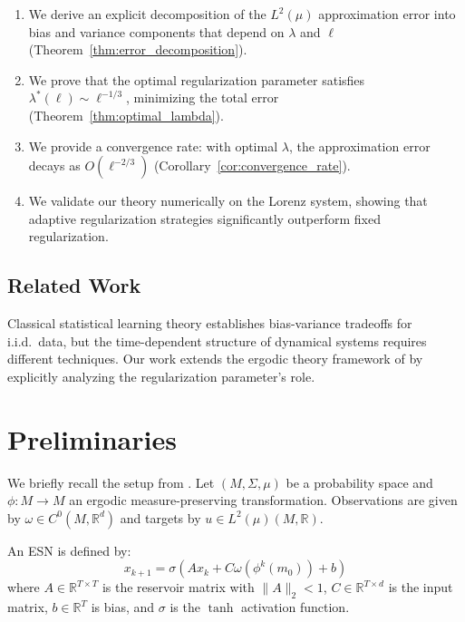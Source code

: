 \documentclass[11pt]{article}
\theoremstyle{definition}
\theoremstyle{remark}
\begin{document}
\begin{enumerate}
\item We derive an explicit decomposition of the $L^2(\mu)$ approximation error into bias and variance components that depend on $\lambda$ and $\ell$ (Theorem~\ref{thm:error_decomposition}).

\item We prove that the optimal regularization parameter satisfies $\lambda^*(\ell) \sim \ell^{-1/3}$, minimizing the total error (Theorem~\ref{thm:optimal_lambda}).

\item We provide a convergence rate: with optimal $\lambda$, the approximation error decays as $O(\ell^{-2/3})$ (Corollary~\ref{cor:convergence_rate}).

\item We validate our theory numerically on the Lorenz system, showing that adaptive regularization strategies significantly outperform fixed regularization.
\end{enumerate}

\subsection{Related Work}

Classical statistical learning theory \cite{Vapnik1998} establishes bias-variance tradeoffs for i.i.d.\ data, but the time-dependent structure of dynamical systems requires different techniques. Our work extends the ergodic theory framework of \cite{Hart2021} by explicitly analyzing the regularization parameter's role.

\section{Preliminaries}

We briefly recall the setup from \cite{Hart2021}. Let $(M, \Sigma, \mu)$ be a probability space and $\phi: M \to M$ an ergodic measure-preserving transformation. Observations are given by $\omega \in C^0(M, \mathbb{R}^d)$ and targets by $u \in L^2(\mu)(M, \mathbb{R})$.

An ESN is defined by:
\begin{equation}
x_{k+1} = \sigma(Ax_k + C\omega(\phi^k(m_0)) + b)
\end{equation}
where $A \in \mathbb{R}^{T \times T}$ is the reservoir matrix with $\|A\|_2 < 1$, $C \in \mathbb{R}^{T \times d}$ is the input matrix, $b \in \mathbb{R}^T$ is bias, and $\sigma$ is the $\tanh$ activation function.
\end{document}
